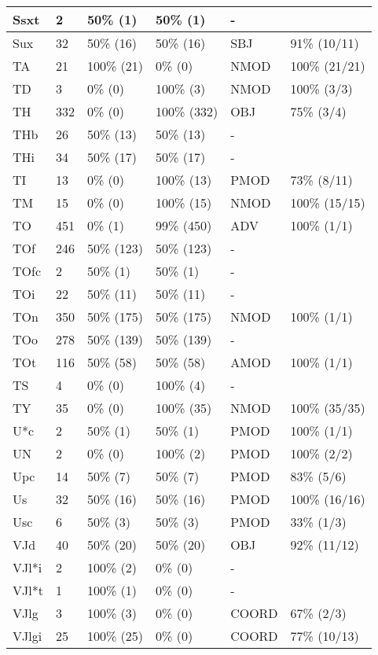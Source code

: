 \begin{figure*}
\begin{tabular}{|l|l|l|l||l|l|}
\hline
 Ssxt & 2 & 50\% (1) & 50\% (1) & - &  \\ 
\hline
 Sux & 32 & 50\% (16) & 50\% (16) & SBJ & 91\% (10/11) \\ 
\hline
 TA & 21 & 100\% (21) & 0\% (0) & NMOD & 100\% (21/21) \\ 
\hline
 TD & 3 & 0\% (0) & 100\% (3) & NMOD & 100\% (3/3) \\ 
\hline
 TH & 332 & 0\% (0) & 100\% (332) & OBJ & 75\% (3/4) \\ 
\hline
 THb & 26 & 50\% (13) & 50\% (13) & - &  \\ 
\hline
 THi & 34 & 50\% (17) & 50\% (17) & - &  \\ 
\hline
 TI & 13 & 0\% (0) & 100\% (13) & PMOD & 73\% (8/11) \\ 
\hline
 TM & 15 & 0\% (0) & 100\% (15) & NMOD & 100\% (15/15) \\ 
\hline
 TO & 451 & 0\% (1) & 99\% (450) & ADV & 100\% (1/1) \\ 
\hline
 TOf & 246 & 50\% (123) & 50\% (123) & - &  \\ 
\hline
 TOfc & 2 & 50\% (1) & 50\% (1) & - &  \\ 
\hline
 TOi & 22 & 50\% (11) & 50\% (11) & - &  \\ 
\hline
 TOn & 350 & 50\% (175) & 50\% (175) & NMOD & 100\% (1/1) \\ 
\hline
 TOo & 278 & 50\% (139) & 50\% (139) & - &  \\ 
\hline
 TOt & 116 & 50\% (58) & 50\% (58) & AMOD & 100\% (1/1) \\ 
\hline
 TS & 4 & 0\% (0) & 100\% (4) & - &  \\ 
\hline
 TY & 35 & 0\% (0) & 100\% (35) & NMOD & 100\% (35/35) \\ 
\hline
 U*c & 2 & 50\% (1) & 50\% (1) & PMOD & 100\% (1/1) \\ 
\hline
 UN & 2 & 0\% (0) & 100\% (2) & PMOD & 100\% (2/2) \\ 
\hline
 Upc & 14 & 50\% (7) & 50\% (7) & PMOD & 83\% (5/6) \\ 
\hline
 Us & 32 & 50\% (16) & 50\% (16) & PMOD & 100\% (16/16) \\ 
\hline
 Usc & 6 & 50\% (3) & 50\% (3) & PMOD & 33\% (1/3) \\ 
\hline
 VJd & 40 & 50\% (20) & 50\% (20) & OBJ & 92\% (11/12) \\ 
\hline
 VJl*i & 2 & 100\% (2) & 0\% (0) & - &  \\ 
\hline
 VJl*t & 1 & 100\% (1) & 0\% (0) & - &  \\ 
\hline
 VJlg & 3 & 100\% (3) & 0\% (0) & COORD & 67\% (2/3) \\ 
\hline
 VJlgi & 25 & 100\% (25) & 0\% (0) & COORD & 77\% (10/13) \\ 
\hline
\end{tabular}
\end{figure*}
